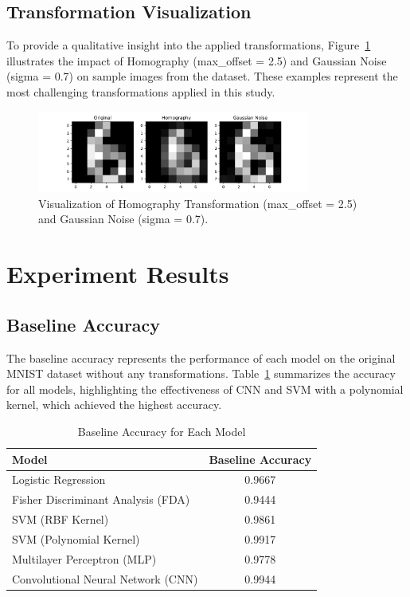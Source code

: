 \documentclass{article}
\begin{document}
\subsection{Transformation Visualization}
To provide a qualitative insight into the applied transformations, Figure~\ref{fig:experiment_visualization} illustrates the impact of Homography (max\_offset = 2.5) and Gaussian Noise (sigma = 0.7) on sample images from the dataset. These examples represent the most challenging transformations applied in this study.

\begin{figure}[h!]
    \centering
    \includegraphics[width=0.8\textwidth]{images/Experiment.pdf}
    \caption{Visualization of Homography Transformation (max\_offset = 2.5) and Gaussian Noise (sigma = 0.7).}
    \label{fig:experiment_visualization}
\end{figure}

\section{Experiment Results}

\subsection{Baseline Accuracy}
The baseline accuracy represents the performance of each model on the original MNIST dataset without any transformations. Table~\ref{tab:baseline_accuracy} summarizes the accuracy for all models, highlighting the effectiveness of CNN and SVM with a polynomial kernel, which achieved the highest accuracy.

\begin{table}[h!]
    \centering
    \caption{Baseline Accuracy for Each Model}
    \label{tab:baseline_accuracy}
    \begin{tabular}{|l|c|}
        \hline
        \textbf{Model} & \textbf{Baseline Accuracy} \\
        \hline
        Logistic Regression & 0.9667 \\
        Fisher Discriminant Analysis (FDA) & 0.9444 \\
        SVM (RBF Kernel) & 0.9861 \\
        SVM (Polynomial Kernel) & 0.9917 \\
        Multilayer Perceptron (MLP) & 0.9778 \\
        Convolutional Neural Network (CNN) & 0.9944 \\
        \hline
    \end{tabular}
\end{table}
\end{document}
